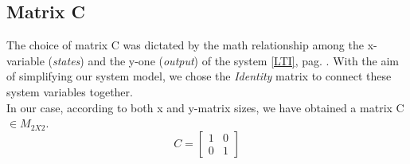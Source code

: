 \documentclass[a4paper,12pt,titlepage]{report}
\numberwithin{figure}{section}
\begin{document}
\subsection{Matrix C}
	The choice of matrix C was dictated by the math relationship among the x-variable (\textit{states}) and the y-one (\textit{output}) of the system \ref{LTI}, pag. \pageref{LTI}. With the aim of simplifying our system model, we chose the \textit{Identity} matrix to connect these system variables together. \\ In our case, according to both x and y-matrix sizes, we have obtained a matrix C $\in M_{2X2}$.
		\begin{equation}
			C = 
			\begin{bmatrix}
				1 & 0 \\
				0 & 1
			\end{bmatrix}
		\end{equation}
\end{document}
